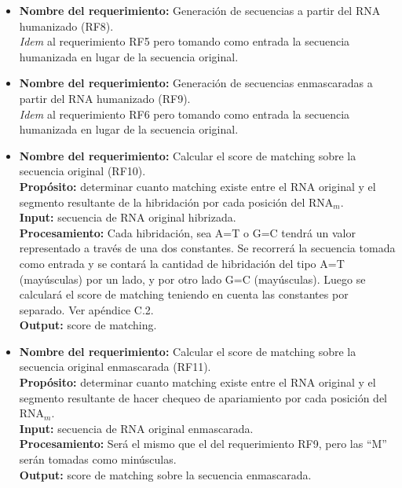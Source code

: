 \documentclass[12pt,a4paper,spanish]{article}
\begin{document}
\begin{itemize}
		\item \textbf{Nombre del requerimiento:} Generación de secuencias a partir del RNA humanizado (RF8).\\
		\textit{Idem} al requerimiento RF5 pero tomando como entrada la secuencia humanizada en lugar de la secuencia 						original. \\

		\item \textbf{Nombre del requerimiento:} Generación de secuencias enmascaradas a partir del RNA humanizado (RF9).\\
		\textit{Idem} al requerimiento RF6 pero tomando como entrada la secuencia humanizada en lugar de la secuencia 						original. \\
		
		\item \textbf{Nombre del requerimiento:} Calcular el score de matching sobre la secuencia original (RF10).\\
 	    \textbf{Propósito:} determinar cuanto matching existe entre el RNA original y el segmento resultante 
							de la hibridación por cada posición del RNA$_m$.\\
		\textbf{Input:} secuencia de RNA original hibrizada. \\
		\textbf{Procesamiento:} Cada hibridación, sea A=T o G=C tendrá un valor representado a través de una dos 									constantes. Se recorrerá la secuencia tomada como entrada y se contará la cantidad de 									hibridación del tipo A=T (mayúsculas) por un lado, y por otro lado G=C (mayúsculas). Luego 									se calculará el score de matching teniendo en cuenta las constantes por separado. Ver 									apéndice C.2. \\								
		\textbf{Output:} score de matching.\\

		\item \textbf{Nombre del requerimiento:} Calcular el score de matching sobre la secuencia original enmascarada 			(RF11).\\
 	    \textbf{Propósito:} determinar cuanto matching existe entre el RNA original y el segmento resultante de hacer 								chequeo de apariamiento por cada posición del RNA$_m$.\\
		\textbf{Input:} secuencia de RNA original enmascarada. \\
		\textbf{Procesamiento:} Será el mismo que el del requerimiento RF9, pero las ``M'' serán tomadas como 			 
        minúsculas.	\\
		\textbf{Output:} score de matching sobre la secuencia enmascarada.\\


\end{itemize}
\end{document}

